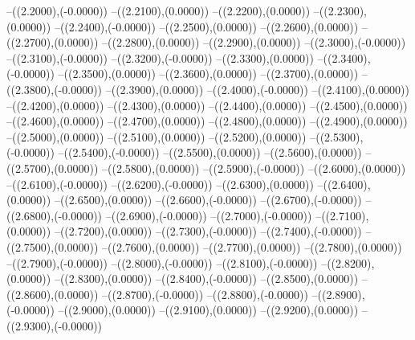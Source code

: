 {	--({\sx*(2.2000)},{\sy*(-0.0000)})
	--({\sx*(2.2100)},{\sy*(0.0000)})
	--({\sx*(2.2200)},{\sy*(0.0000)})
	--({\sx*(2.2300)},{\sy*(0.0000)})
	--({\sx*(2.2400)},{\sy*(-0.0000)})
	--({\sx*(2.2500)},{\sy*(0.0000)})
	--({\sx*(2.2600)},{\sy*(0.0000)})
	--({\sx*(2.2700)},{\sy*(0.0000)})
	--({\sx*(2.2800)},{\sy*(0.0000)})
	--({\sx*(2.2900)},{\sy*(0.0000)})
	--({\sx*(2.3000)},{\sy*(-0.0000)})
	--({\sx*(2.3100)},{\sy*(-0.0000)})
	--({\sx*(2.3200)},{\sy*(-0.0000)})
	--({\sx*(2.3300)},{\sy*(0.0000)})
	--({\sx*(2.3400)},{\sy*(-0.0000)})
	--({\sx*(2.3500)},{\sy*(0.0000)})
	--({\sx*(2.3600)},{\sy*(0.0000)})
	--({\sx*(2.3700)},{\sy*(0.0000)})
	--({\sx*(2.3800)},{\sy*(-0.0000)})
	--({\sx*(2.3900)},{\sy*(0.0000)})
	--({\sx*(2.4000)},{\sy*(-0.0000)})
	--({\sx*(2.4100)},{\sy*(0.0000)})
	--({\sx*(2.4200)},{\sy*(0.0000)})
	--({\sx*(2.4300)},{\sy*(0.0000)})
	--({\sx*(2.4400)},{\sy*(0.0000)})
	--({\sx*(2.4500)},{\sy*(0.0000)})
	--({\sx*(2.4600)},{\sy*(0.0000)})
	--({\sx*(2.4700)},{\sy*(0.0000)})
	--({\sx*(2.4800)},{\sy*(0.0000)})
	--({\sx*(2.4900)},{\sy*(0.0000)})
	--({\sx*(2.5000)},{\sy*(0.0000)})
	--({\sx*(2.5100)},{\sy*(0.0000)})
	--({\sx*(2.5200)},{\sy*(0.0000)})
	--({\sx*(2.5300)},{\sy*(-0.0000)})
	--({\sx*(2.5400)},{\sy*(-0.0000)})
	--({\sx*(2.5500)},{\sy*(0.0000)})
	--({\sx*(2.5600)},{\sy*(0.0000)})
	--({\sx*(2.5700)},{\sy*(0.0000)})
	--({\sx*(2.5800)},{\sy*(0.0000)})
	--({\sx*(2.5900)},{\sy*(-0.0000)})
	--({\sx*(2.6000)},{\sy*(0.0000)})
	--({\sx*(2.6100)},{\sy*(-0.0000)})
	--({\sx*(2.6200)},{\sy*(-0.0000)})
	--({\sx*(2.6300)},{\sy*(0.0000)})
	--({\sx*(2.6400)},{\sy*(0.0000)})
	--({\sx*(2.6500)},{\sy*(0.0000)})
	--({\sx*(2.6600)},{\sy*(-0.0000)})
	--({\sx*(2.6700)},{\sy*(-0.0000)})
	--({\sx*(2.6800)},{\sy*(-0.0000)})
	--({\sx*(2.6900)},{\sy*(-0.0000)})
	--({\sx*(2.7000)},{\sy*(-0.0000)})
	--({\sx*(2.7100)},{\sy*(0.0000)})
	--({\sx*(2.7200)},{\sy*(0.0000)})
	--({\sx*(2.7300)},{\sy*(-0.0000)})
	--({\sx*(2.7400)},{\sy*(-0.0000)})
	--({\sx*(2.7500)},{\sy*(0.0000)})
	--({\sx*(2.7600)},{\sy*(0.0000)})
	--({\sx*(2.7700)},{\sy*(0.0000)})
	--({\sx*(2.7800)},{\sy*(0.0000)})
	--({\sx*(2.7900)},{\sy*(-0.0000)})
	--({\sx*(2.8000)},{\sy*(-0.0000)})
	--({\sx*(2.8100)},{\sy*(-0.0000)})
	--({\sx*(2.8200)},{\sy*(0.0000)})
	--({\sx*(2.8300)},{\sy*(0.0000)})
	--({\sx*(2.8400)},{\sy*(-0.0000)})
	--({\sx*(2.8500)},{\sy*(0.0000)})
	--({\sx*(2.8600)},{\sy*(0.0000)})
	--({\sx*(2.8700)},{\sy*(-0.0000)})
	--({\sx*(2.8800)},{\sy*(-0.0000)})
	--({\sx*(2.8900)},{\sy*(-0.0000)})
	--({\sx*(2.9000)},{\sy*(0.0000)})
	--({\sx*(2.9100)},{\sy*(0.0000)})
	--({\sx*(2.9200)},{\sy*(0.0000)})
	--({\sx*(2.9300)},{\sy*(-0.0000)})
}
